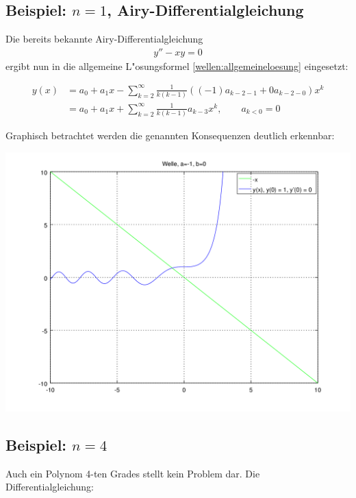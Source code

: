 \subsection{Beispiel: $n = 1$, Airy-Differentialgleichung}
Die bereits bekannte Airy-Differentialgleichung
\begin{align*}
	y''-xy = 0
\end{align*}
ergibt nun in die allgemeine L"osungsformel \ref{wellen:allgemeineloesung} 
eingesetzt:

\begin{equation*}
\begin{split}
	y(x) &= a_0+a_1x-\sum_{k=2}^{\infty} \frac{1}{k(k-1)} ((-1) a_{k-2-1} + 0 
	a_{k-2-0}) x^k
	\\
	&= a_0+a_1x+\sum_{k=2}^{\infty} \frac{1}{k(k-1)} a_{k-3} x^k,
	\qquad a_{k < 0} = 0
\end{split}
\end{equation*}

Graphisch betrachtet werden die genannten Konsequenzen deutlich erkennbar:

\begin{center}
	\includegraphics[scale=0.65]{./wellen/images/allgemein/n1.png}
\end{center}

\subsection{Beispiel: $n = 4$}

Auch ein Polynom 4-ten Grades stellt kein Problem dar. Die 
Differentialgleichung:

